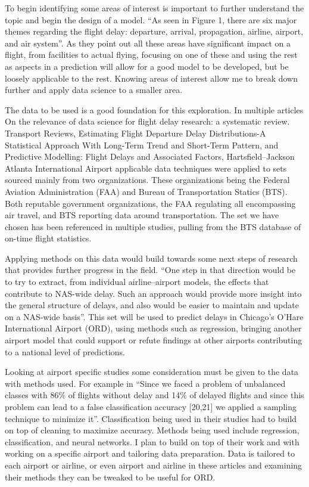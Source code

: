 \documentclass[a4paper,12pt]{article}
\begin{document}
To begin identifying some areas of interest is important to further understand the topic and begin the design of a model. “As seen in Figure 1,
there are six major themes regarding the flight delay: departure, arrival, propagation, airline, airport, and air system”\cite{doi:10.1080/01441647.2020.1861123}.%
As they point out all these areas have significant impact on a flight, from facilities to actual flying, focusing on one of these and using the rest as aspects in a prediction
will allow for a good model to be developed, but be loosely applicable to the rest. Knowing areas of interest allow me to break down further and apply data science to a smaller area.

The data to be used is a good foundation for this exploration. In multiple articles On the relevance of data science for flight delay research: a systematic review. Transport Reviews,
Estimating Flight Departure Delay Distributions-A Statistical Approach With Long-Term Trend and Short-Term Pattern, and Predictive Modelling: Flight Delays and Associated Factors,
Hartsfield–Jackson Atlanta International Airport applicable data techniques were applied to sets sourced mainly from two organizations. These organizations being the Federal Aviation Administration (FAA)
and Bureau of Transportation Statics (BTS). Both reputable government organizations, the FAA regulating all encompassing air travel, and BTS reporting data around transportation.
The set we have chosen has been referenced in multiple studies, pulling from the BTS database of on-time flight statistics. 

Applying methods on this data would build towards some next steps of research that provides further progress in the field. “One step in that direction would be to try to extract, from individual airline–airport models,
the effects that contribute to NAS-wide delay. Such an approach would provide more insight into the general structure of delays, and also would be easier to maintain and update on a NAS-wide basis”\cite{doi:10.1198/016214507000000257}. %
 This set will be used to predict delays in Chicago’s O’Hare International Airport (ORD), using methods such as regression, bringing another airport model that could support or refute findings at other airports contributing to a national level of predictions.

Looking at airport specific studies some consideration must be given to the data with methods used. For example in “Since we faced a problem of unbalanced classes with 86\% of flights without delay and 14\% of delayed flights
 and since this problem can lead to a false classification accuracy [20,21] we applied a sampling technique to minimize it”\cite{HENRIQUES2018638}. Classification being used in their studies had to build on top of cleaning to maximize accuracy. %
  Methods being used include regression, classification, and neural networks. I plan to build on top of their work and with working on a specific airport and tailoring data preparation. Data is tailored to each airport or airline,
   or even airport and airline in these articles and examining their methods they can be tweaked to be useful for ORD. 
\end{document}
